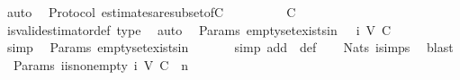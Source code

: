 \begin{isabellebody}
\ auto%
\endisatagproof
{\isafoldproof}%
%
\isadelimproof
\isanewline
%
\endisadelimproof
\isanewline
{}\isamarkupfalse%
\ {\isacharparenleft}\ Protocol{\isacharparenright}\ estimates{\isacharunderscore}are{\isacharunderscore}subset{\isacharunderscore}of{\isacharunderscore}C{\isacharcolon}\ {\isachardoublequoteopen}{\isasymAnd}\ {\isasymsigma}{\isachardot}\ {\isasymsigma}\ {\isasymin}\ {\isasymSigma}\ {\isasymLongrightarrow}\ {\isasymepsilon}\ {\isasymsigma}\ {\isasymsubseteq}\ C{\isachardoublequoteclose}\isanewline
%
\isadelimproof
\ \ %
\endisadelimproof
%
\isatagproof
{}\isamarkupfalse%
\ is{\isacharunderscore}valid{\isacharunderscore}estimator{\isacharunderscore}def\ {\isasymepsilon}{\isacharunderscore}type\ \isamarkupfalse%
\ auto%
\endisatagproof
{\isafoldproof}%
%
\isadelimproof
\isanewline
%
\endisadelimproof
\isanewline
{}\isamarkupfalse%
\ {\isacharparenleft}\ Params{\isacharparenright}\ empty{\isacharunderscore}set{\isacharunderscore}exists{\isacharunderscore}in{\isacharunderscore}{\isasymSigma}{\isacharunderscore}{}{\isacharcolon}\ {\isachardoublequoteopen}{\isasymemptyset}\ {\isasymin}\ {\isasymSigma}{\isacharunderscore}i\ {\isacharparenleft}V{\isacharcomma}\ C{\isacharcomma}\ {\isasymepsilon}{\isacharparenright}\ {}{\isachardoublequoteclose}\isanewline
%
\isadelimproof
\ \ %
\endisadelimproof
%
\isatagproof
{}\isamarkupfalse%
\ simp%
\endisatagproof
{\isafoldproof}%
%
\isadelimproof
\isanewline
%
\endisadelimproof
\isanewline
{}\isamarkupfalse%
\ {\isacharparenleft}\ Params{\isacharparenright}\ empty{\isacharunderscore}set{\isacharunderscore}exists{\isacharunderscore}in{\isacharunderscore}{\isasymSigma}{\isacharcolon}\ {\isachardoublequoteopen}{\isasymemptyset}\ {\isasymin}\ {\isasymSigma}{\isachardoublequoteclose}\isanewline
%
\isadelimproof
\ \ %
\endisadelimproof
%
\isatagproof
{}\isamarkupfalse%
\ {\isacharparenleft}simp\ add{\isacharcolon}\ \ {\isasymSigma}{\isacharunderscore}def{\isacharparenright}\isanewline
\ \ \isamarkupfalse%
\ Nats{\isacharunderscore}{}\ {\isasymSigma}{\isacharunderscore}i{\isachardot}simps{\isacharparenleft}{}{\isacharparenright}\ \isamarkupfalse%
\ blast%
\endisatagproof
{\isafoldproof}%
%
\isadelimproof
\isanewline
%
\endisadelimproof
\isanewline
{}\isamarkupfalse%
\ {\isacharparenleft}\ Params{\isacharparenright}\ {\isasymSigma}{\isacharunderscore}i{\isacharunderscore}is{\isacharunderscore}non{\isacharunderscore}empty{\isacharcolon}\ {\isachardoublequoteopen}{\isasymSigma}{\isacharunderscore}i\ {\isacharparenleft}V{\isacharcomma}\ C{\isacharcomma}\ {\isasymepsilon}{\isacharparenright}\ n\ {\isasymnoteq}\ {\isasymemptyset}{\isachardoublequoteclose}\isanewline

\end{isabellebody}
